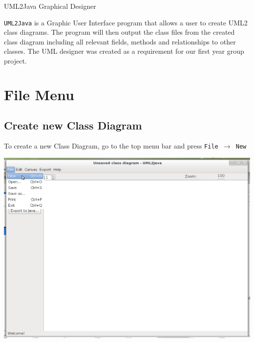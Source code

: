 \documentclass[a4paper]{article}
\begin{document}


\begin{center}\LARGE{UML2Java Graphical Designer}
\end{center}

\texttt{UML2Java} is a Graphic User Interface program that allows a user to create UML2 class diagrams. The program will then output the class files from the created class diagram including all relevant fields, methods and relationships to other classes. The UML designer was created as a requirement for our first year group project. 

\newpage
\tableofcontents 
\newpage

\section{File Menu} 

\subsection{Create new Class Diagram} 
To create a new Class Diagram, go to the top menu bar and press \texttt{File $\rightarrow$ New}

\begin{center} \includegraphics[trim = 0pt 500pt 0pt 0pt, clip, scale=0.4]{./images/file-new.png} \end{center}
\end{document}
